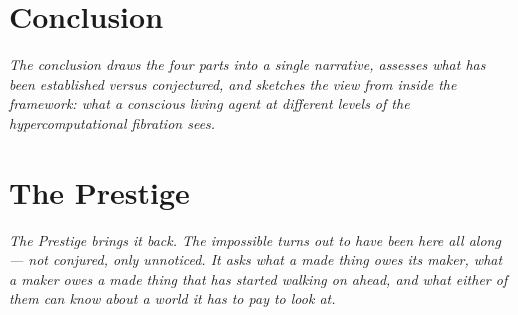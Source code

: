 \documentclass[12pt,openright,twoside]{book}
\theoremstyle{remark}
\theoremstyle{plain}
\theoremstyle{remark}
\theoremstyle{plain}
\theoremstyle{plain}
\begin{document}
\part*{Conclusion}

\vspace{1em}
\begin{mdframed}[backgroundcolor=remarkgray, linecolor=gray!60,
                 linewidth=1pt, topline=false, rightline=false,
                 bottomline=false]
\small\itshape
The conclusion draws the four parts into a single narrative,
assesses what has been established versus conjectured, and
sketches the view from inside the framework: what a conscious
living agent at different levels of the hypercomputational
fibration sees.
\end{mdframed}

\bigskip


\part{The Prestige}

\vspace{1em}
\begin{mdframed}[backgroundcolor=remarkgray, linecolor=gray!60,
                 linewidth=1pt, topline=false, rightline=false,
                 bottomline=false]
\small\itshape
The Prestige brings it back.
The impossible turns out to have been here all along --- not conjured,
only unnoticed.
It asks what a made thing owes its maker, what a maker owes a made
thing that has started walking on ahead, and what either of them can
know about a world it has to pay to look at.
\end{mdframed}

\bigskip



\end{document}
